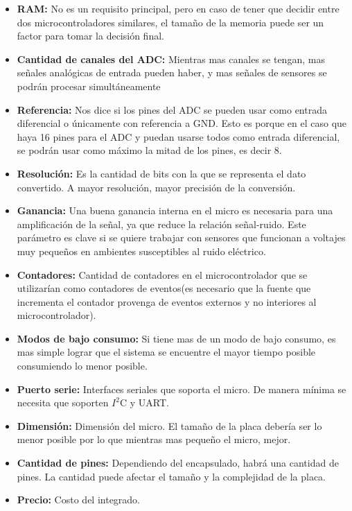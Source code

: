 \begin{itemize}
  \item \textbf{RAM:} No es un requisito principal, pero en caso de tener que decidir entre dos microcontroladores similares, el tamaño de la memoria puede ser un factor para tomar la decisión final.
  \item \textbf{Cantidad de canales del ADC:} Mientras mas canales se tengan, mas señales analógicas de entrada pueden haber, y mas señales de sensores se podrán procesar simultáneamente
  \item \textbf{Referencia:} Nos dice si los pines del ADC se pueden usar como entrada diferencial o únicamente con referencia a GND. Esto es porque en el caso que haya 16 pines para el ADC y puedan usarse todos como entrada diferencial, se podrán usar como máximo la mitad de los pines, es decir 8.
  \item \textbf{Resolución:} Es la cantidad de bits con la que se representa el dato convertido. A mayor resolución, mayor precisión de la conversión.
  \item \textbf{Ganancia:} Una buena ganancia interna en el micro es necesaria para una amplificación de la señal, ya que reduce la relación señal-ruido. Este parámetro es clave si se quiere trabajar con sensores que funcionan a voltajes muy pequeños en ambientes susceptibles al ruido eléctrico.
  \item \textbf{Contadores:} Cantidad de contadores en el microcontrolador que se utilizarían como contadores de eventos(es necesario que la fuente que incrementa el contador provenga de eventos externos y no interiores al microcontrolador).
  \item \textbf{Modos de bajo consumo:} Si tiene mas de un modo de bajo consumo, es mas simple lograr que el sistema se encuentre el mayor tiempo posible consumiendo lo menor posible.
  \item \textbf{Puerto serie:} Interfaces seriales que soporta el micro. De manera mínima se necesita que soporten $I^{2}$C y UART.
  \item \textbf{Dimensión:} Dimensión del micro. El tamaño de la placa debería ser lo menor posible por lo que mientras mas pequeño el micro, mejor.
  \item \textbf{Cantidad de pines:} Dependiendo del encapsulado, habrá una cantidad de pines. La cantidad puede afectar el tamaño y la complejidad de la placa.
  \item \textbf{Precio:} Costo del integrado.
\end{itemize}

